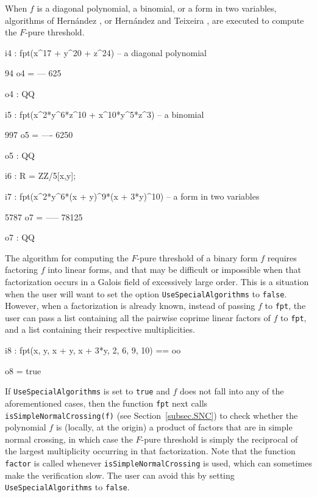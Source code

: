 \documentclass{amsart}
\begin{document}
When $f$ is a diagonal polynomial, a binomial, or a form in two variables, algorithms of Hern\'andez \cite{HernandezFInvariantsOfDiagonalHyp, HernandezFPureThresholdOfBinomial}, or Hern\'andez and Teixeira \cite{HernandezTeixeiraFThresholdFunctions},  are executed to compute the $F$-pure threshold.

\medskip
{\small
{}
\begin{MyVerbatim}
i4 : fpt(x^17 + y^20 + z^24) -- a diagonal polynomial

      94
o4 = ---
     625

o4 : QQ

i5 : fpt(x^2*y^6*z^10 + x^10*y^5*z^3) -- a binomial

      997
o5 = ----
     6250

o5 : QQ

i6 : R = ZZ/5[x,y];

i7 : fpt(x^2*y^6*(x + y)^9*(x + 3*y)^10) -- a form in two variables

      5787
o7 = -----
     78125

o7 : QQ
\end{MyVerbatim}
}
\medskip

The algorithm for computing the $F$-pure threshold of a binary form $f$ requires factoring $f$ into linear forms, and that may be difficult or impossible when that factorization occurs in a Galois field of excessively large order.
This is a situation when the user will want to set the option \texttt{UseSpecialAlgorithms} to \texttt{false}.
However, when a factorization is already known, instead of passing $f$ to \texttt{fpt}, the user can pass a list containing all the pairwise coprime linear factors of $f$ to \texttt{fpt}, and a list containing their respective multiplicities.


\medskip
{\small
{}
\begin{MyVerbatim}
i8 : fpt({x, y, x + y, x + 3*y}, {2, 6, 9, 10}) == oo

o8 = true
\end{MyVerbatim}
}
\medskip

If \texttt{UseSpecialAlgorithms} is set to \texttt{true} and $f$ does not fall into any of the aforementioned cases, then the function \texttt{fpt} next calls \texttt{isSimpleNormalCrossing(f)} (see Section~\ref{subsec.SNC}) to check whether the polynomial $f$ is (locally, at the origin) a product of factors that are in simple normal crossing, in which case the $F$-pure threshold is simply the reciprocal of the largest multiplicity occurring in that factorization.  
Note that the function \texttt{factor} is called whenever \texttt{isSimpleNormalCrossing} is used, which can sometimes make the verification slow.  The user can avoid this by setting \texttt{UseSpecialAlgorithms} to \texttt{false}.
\end{document}
